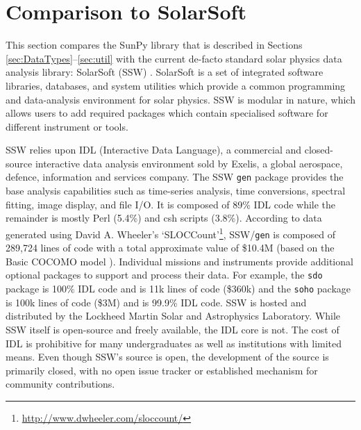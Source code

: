 \section{Comparison to SolarSoft}\label{sec:ssw}
This section compares the SunPy library that is described in Sections 
\ref{sec:DataTypes}--\ref{sec:util} with the current de-facto standard solar 
physics data analysis library: SolarSoft (SSW) \citep{ssw}.
SolarSoft is a set of integrated software libraries, databases, and system 
utilities which provide a common programming and data-analysis environment for 
solar physics. SSW is modular in nature, which allows users to add required 
packages which contain specialised software for different instrument or tools.


SSW relies upon IDL (Interactive Data 
Language), a commercial and closed-source interactive data analysis environment 
sold by Exelis, a global aerospace, defence, information and services company. 
The SSW \texttt{gen} package provides the base analysis capabilities such as time-series
analysis, time conversions, spectral fitting, image display, and file 
I/O. It is composed of 89\% IDL code while the remainder is mostly Perl (5.4\%) 
and csh scripts (3.8\%). 
According to data generated using David A. Wheeler's `SLOCCount'\footnote{\url{http://www.dwheeler.com/sloccount/}}, SSW/\texttt{gen} is composed of 
289,724 lines of code with a total approximate value of \$10.4M (based on the 
Basic COCOMO model \citep{cocomo}). 
Individual missions and instruments provide additional optional packages to 
support and process their data. For example, the \texttt{sdo} package \citep{sdo} is 
100\% IDL code and is 11k lines of code (\$360k) and the \texttt{soho} package 
\citep{soho} is 100k lines of code (\$3M) and is 99.9\% IDL code. SSW is hosted 
and distributed by the Lockheed Martin Solar and Astrophysics Laboratory.
While SSW itself is open-source and freely available, the IDL core is not. The cost 
of IDL is prohibitive for many undergraduates as well as institutions 
with limited means.
Even though SSW's source is open, the development of the source is primarily closed,
with no open issue tracker or established mechanism for community contributions.

